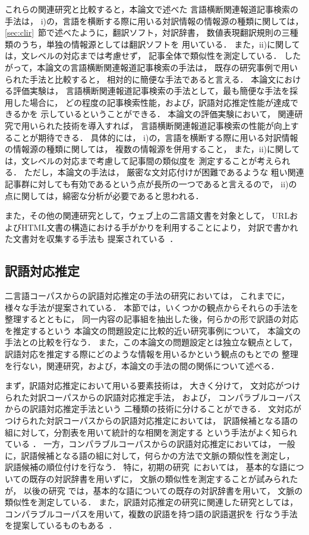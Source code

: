 これらの関連研究と比較すると，本論文で述べた
言語横断関連報道記事検索の手法は，
i)の，言語を横断する際に用いる対訳情報の情報源の種類に関しては，
\ref{sec:clir}~節で述べたように，翻訳ソフト，対訳辞書，
数値表現翻訳規則の三種類のうち，単独の情報源としては翻訳ソフトを
用いている．
また，ii)に関しては，文レベルの対応までは考慮せず，
記事全体で類似性を測定している．
したがって，本論文の言語横断関連報道記事検索の手法は，
既存の研究事例で用いられた手法と比較すると，
相対的に簡便な手法であると言える．
本論文における評価実験は，
言語横断関連報道記事検索の手法として，最も簡便な手法を採用した場合に，
どの程度の記事検索性能，および，訳語対応推定性能が達成できるかを
示しているということができる．
本論文の評価実験において，
関連研究で用いられた技術を導入すれば，
言語横断関連報道記事検索の性能が向上することが期待できる．
具体的には，
i)の，言語を横断する際に用いる対訳情報の情報源の種類に関しては，
複数の情報源を併用すること，
また，ii)に関しては，文レベルの対応まで考慮して記事間の類似度を
測定することが考えられる．
ただし，本論文の手法は，
厳密な文対応付けが困難であるような
粗い関連記事群に対しても有効であるという点が長所の一つであると言えるので，
ii)の点に関しては，綿密な分析が必要であると思われる．

また，その他の関連研究として，ウェブ上の二言語文書を対象として，
URLおよびHTML文書の構造における手がかりを利用することにより，
対訳で書かれた文書対を収集する手法も
提案されている~\cite{Resnik03a,Nie99a}．

\subsection{訳語対応推定}

二言語コーパスからの訳語対応推定の手法の研究においては，
これまでに，様々な手法が提案されている．
本節では，いくつかの観点からそれらの手法を整理するとともに，
同一内容の記事組を抽出した後，何らかの形で訳語の対応を推定するという
本論文の問題設定に比較的近い研究事例について，
本論文の手法との比較を行なう．
また，この本論文の問題設定とは独立な観点として，
訳語対応を推定する際にどのような情報を用いるかという観点のもとでの
整理を行ない，関連研究，および，本論文の手法の間の関係について述べる．

まず，訳語対応推定において用いる要素技術は，
大きく分けて，
文対応がつけられた対訳コーパスからの訳語対応推定手法，
および，
コンパラブルコーパスからの訳語対応推定手法という
二種類の技術に分けることができる．
文対応がつけられた対訳コーパスからの訳語対応推定においては，
訳語候補となる語の組に対して，分割表を用いて統計的な相関を測定する
という手法がよく知られている
\cite{Gale91a,Kumano94b,Haruno98dj,Smadja96a,Kitamura96a,Melamed00a}．
一方，コンパラブルコーパスからの訳語対応推定においては，
一般に，訳語候補となる語の組に対して，何らかの方法で文脈の類似性を測定し，
訳語候補の順位付けを行なう．
特に，初期の研究~\cite{Fung95b,Rapp95a}においては，
基本的な語についての既存の対訳辞書を用いずに，
文脈の類似性を測定することが試みられたが，
以後の研究
\cite{KTanaka96a,Fung98a,Rapp99a,Kaji01aj,Chiao02a,TTanaka02a,Gaussier04a}
では，基本的な語についての既存の対訳辞書を用いて，
文脈の類似性を測定している．
また，訳語対応推定の研究に関連した研究としては，
コンパラブルコーパスを用いて，複数の訳語を持つ語の訳語選択を
行なう手法を提案しているものもある~\cite{Dagan94c,HNakagawa01a}．

